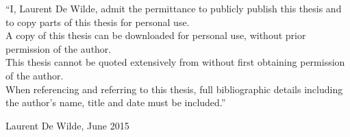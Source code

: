\vspace{1.5cm}

\noindent
``I, Laurent De Wilde, admit the permittance to publicly publish this thesis and to copy parts of this thesis for personal use. \\
A copy of this thesis can be downloaded for personal use, without prior permission of the author. \\
This thesis cannot be quoted extensively from without first obtaining permission of the author. \\
When referencing and referring to this thesis, full bibliographic details including the author's name, title and date must be included.''

\addvspace{4cm}

\noindent Laurent De Wilde, June 2015
